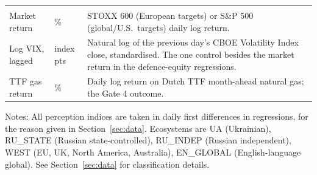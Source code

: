 \documentclass[12pt,a4paper]{article}
\begin{document}
\begin{table}[htbp]
\begin{threeparttable}
\begin{tabular}{p{3.1cm} p{1.9cm} p{8.6cm}}
\addlinespace
\multicolumn{3}{l}{\textit{Financial controls}} \\
Market return & \% & STOXX 600 (European targets) or S\&P 500 (global/U.S.\ targets) daily log return. \\
Log VIX, lagged & index pts & Natural log of the previous day's CBOE Volatility Index close, standardised. The one control besides the market return in the defence-equity regressions. \\
TTF gas return & \% & Daily log return on Dutch TTF month-ahead natural gas; the Gate 4 outcome. \\
\bottomrule
\end{tabular}
\begin{tablenotes}
\small
\item Notes: All perception indices are taken in daily first differences in regressions, for the reason given in Section~\ref{sec:data}. Ecosystems are UA (Ukrainian), RU\_STATE (Russian state-controlled), RU\_INDEP (Russian independent), WEST (EU, UK, North America, Australia), EN\_GLOBAL (English-language global). See Section~\ref{sec:data} for classification details.
\end{tablenotes}
\end{threeparttable}
\end{table}
\end{document}
